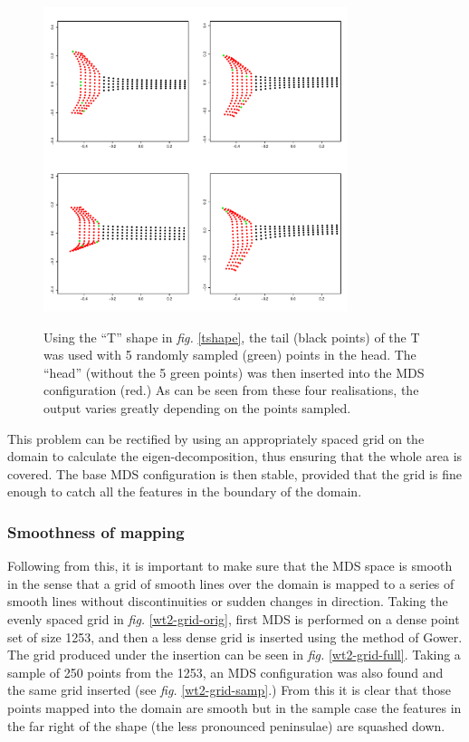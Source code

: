 \documentclass[a4paper,10pt]{article}
\newcommand{\fig}[1]{\emph{fig.} \ref{#1}}
\begin{document}
\begin{figure}
\centering
\includegraphics[width=3.5in]{figs/tshaperand.pdf} \\
\caption{Using the ``T'' shape in \fig{tshape}, the tail (black points) of the T was used with 5 randomly sampled (green) points in the head. The ``head'' (without the 5 green points) was then inserted into the MDS configuration (red.) As can be seen from these four realisations, the output varies greatly depending on the points sampled.}
\label{tshaperand}
\end{figure}

This problem can be rectified by using an appropriately spaced grid on the domain to calculate the eigen-decomposition, thus ensuring that the whole area is covered. The base MDS configuration is then stable, provided that the grid is fine enough to catch all the features in the boundary of the domain.

\subsubsection{Smoothness of mapping}

Following from this, it is important to make sure that the MDS space is smooth in the sense that a grid of smooth lines over the domain is mapped to a series of smooth lines without discontinuities or sudden changes in direction. Taking the evenly spaced grid in \fig{wt2-grid-orig}, first MDS is performed on a dense point set of size 1253, and then a less dense grid is inserted using the method of Gower. The grid produced under the insertion can be seen in \fig{wt2-grid-full}. Taking a sample of 250 points from the 1253, an MDS configuration was also found and the same grid inserted (see \fig{wt2-grid-samp}.) From this it is clear that those points mapped into the domain are smooth but in the sample case the features in the far right of the shape (the less pronounced peninsulae) are squashed down.
\end{document}

